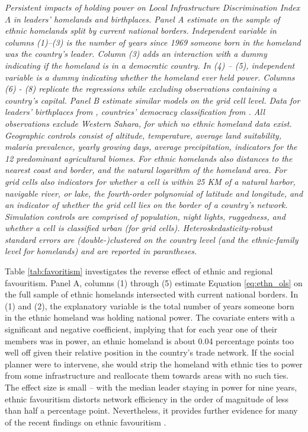 \documentclass[11pt, oneside]{article}   	%
\newcommand{\mysubcaption}[1]{
\justify
\begin{spacing}{0.7}
\textit{\footnotesize #1}
\end{spacing}}
\begin{document}
\begin{table}[!t]
\mysubcaption{Persistent impacts of holding power on Local Infrastructure Discrimination Index $\Lambda$ in leaders' homelands and birthplaces. Panel A estimate on the sample of ethnic homelands split by current national borders. Independent variable in columns (1)--(3) is the number of years since 1969 someone born in the homeland was the country's leader. Column (3) adds an interaction with a dummy indicating if the homeland is in a democratic country. In (4) -- (5), independent variable is a dummy indicating whether the homeland ever held power. Columns (6) - (8) replicate the regressions while excluding observations containing a country's capital. Panel B estimate similar models on the grid cell level. Data for leaders' birthplaces from \cite{Dreher_AiddemandAfrican_2016}, countries' democracy classification from \cite{Marshall_PolityProjectCenter_2015}. All observations exclude Western Sahara, for which no ethnic homeland data exist. Geographic controls consist of altitude, temperature, average land suitability, malaria prevalence, yearly growing days, average precipitation, indicators for the 12 predominant agricultural biomes. For ethnic homelands also distances to the nearest coast and border, and the natural logarithm of the homeland area. For grid cells also indicators for whether a cell is within 25 KM of a natural harbor, navigable river, or lake, the fourth-order polynomial of latitude and longitude, and an indicator of whether the grid cell lies on the border of a country's network. Simulation controls are comprised of population, night lights, ruggedness, and whether a cell is classified urban (for grid cells). Heteroskedasticity-robust standard errors are (double-)clustered on the country level (and the ethnic-family level for homelands) and are reported in parantheses.}
\end{table}

Table \eqref{tab:favoritism} investigates the reverse effect of ethnic and regional favouritism. Panel A, columns (1) through (5) estimate Equation \eqref{eq:ethn_ols} on the full sample of ethnic homelands intersected with current national borders. In (1) and (2), the explanatory variable is the total number of years someone born in the ethnic homeland was holding national power. The covariate enters with a significant and negative coefficient, implying that for each year one of their members was in power, an ethnic homeland is about 0.04 percentage points too well off given their relative position in the country's trade network. If the social planner were to intervene, she would strip the homeland with ethnic ties to power from some infrastructure and reallocate them towards areas with no such ties. The effect size is small -- with the median leader staying in power for nine years, ethnic favouritism distorts network efficiency in the order of magnitude of less than half a percentage point. Nevertheless, it provides further evidence for many of the recent findings on ethnic favouritism \citep{DeLuca_Ethnicfavoritismaxiom_2018}.
\end{document}
